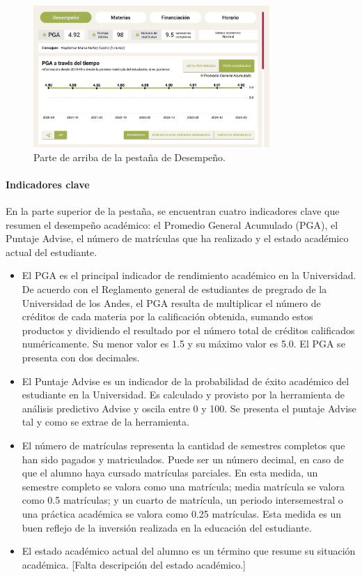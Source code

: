\begin{figure}[H]
	\centering
	\includegraphics[width=0.8\textwidth]{assets/nes/desempeno_1.png}
	\caption{Parte de arriba de la pestaña de Desempeño.}
	\label{fig:desempeno}
\end{figure}

\paragraph{Indicadores clave} En la parte superior de la pestaña, se encuentran cuatro indicadores clave que resumen el desempeño académico: el Promedio General Acumulado (PGA), el Puntaje Advise, el número de matrículas que ha realizado y el estado académico actual del estudiante.
\begin{itemize}
	\item El PGA es el principal indicador de rendimiento académico en la Universidad. De acuerdo con el Reglamento general de estudiantes de pregrado de la Universidad de los Andes, el PGA resulta de multiplicar el número de créditos de cada materia por la calificación obtenida, sumando estos productos y dividiendo el resultado por el número total de créditos calificados numéricamente.
	      Su menor valor es 1.5 y su máximo valor es 5.0. El PGA se presenta con dos decimales.
	\item El Puntaje Advise es un indicador de la probabilidad de éxito académico del estudiante en la Universidad. Es calculado y provisto por la herramienta de análisis predictivo Advise y oscila entre 0 y 100. Se presenta el puntaje Advise tal y como se extrae de la herramienta.
	\item El número de matrículas representa la cantidad de semestres completos que han sido pagados y matriculados. Puede ser un número decimal, en caso de que el alumno haya cursado matrículas parciales. En esta medida, un semestre completo se valora como una matrícula; media matrícula se valora como 0.5 matrículas; y un cuarto de matrícula, un periodo intersemestral o una práctica académica se valora como 0.25 matrículas. Esta medida es un buen reflejo de la inversión realizada en la educación del estudiante.
	\item El estado académico actual del alumno es un término que resume su situación académica. [Falta descripción del estado académico.]
\end{itemize}

